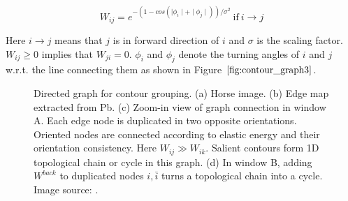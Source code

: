 \documentclass{SMBV12}
\begin{document}
\begin{equation}
W_{ij} = e^{-(1 - cos(\mid \phi_i \mid + \mid \phi_j \mid))/\sigma^2}\ \mathrm{if}\ i \rightarrow j
\end{equation}

Here $i \rightarrow j$ means that $j$ is in forward direction of $i$ and $\sigma$ is the scaling factor. $W_{ij} \geq 0$ implies that $W_{ji} = 0$. $\phi_i$ and $\phi_j$ denote the turning angles of $i$ and $j$ w.r.t. the line connecting them as shown in Figure $\ref{fig:contour_graph3}$.

\begin{figure}[htbp]
    \centering
    \caption{Directed graph for contour grouping. (a) Horse image. (b) Edge map extracted from Pb. (c) Zoom-in view of graph connection in window A. Each edge node is duplicated in two opposite orientations. Oriented nodes are connected according to elastic energy and their orientation consistency. Here $W_{ij} \gg W_{ik}$. Salient contours form 1D topological chain or cycle in this graph. (d) In window B, adding $W^{back}$ to duplicated nodes $i, \bar{i}$ turns a topological chain into a cycle. Image source: \cite{zhu2007untangling}.}
\end{figure}
\end{document}
